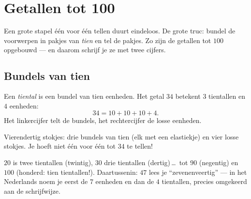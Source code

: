 \chapter{Getallen tot 100}\label{ch:g1:tens}

Een grote stapel één voor één tellen duurt eindeloos. De grote truc:
bundel de voorwerpen in pakjes van \emph{tien} en tel de pakjes. Zo
zijn de getallen tot $100$ opgebouwd --- en daarom schrijf je ze met
twee cijfers.

\section{Bundels van tien}

\begin{definition}\label{def:g1:tens:def}
Een \emph{tiental} is een bundel van tien eenheden. Het getal $34$
betekent $3$ tientallen en $4$ eenheden:
\[
34 = 10 + 10 + 10 + 4 .
\]
Het linkercijfer telt de bundels, het rechtercijfer de losse eenheden.
\end{definition}

\begin{omfigure}

{\small Vierendertig stokjes: drie bundels van tien (elk met een
elastiekje) en vier losse stokjes. Je hoeft niet één voor één tot $34$
te tellen!}
\end{omfigure}

\begin{example}\label{ex:g1:tens:reading}
$20$ is twee tientallen (twintig), $30$ drie tientallen
(dertig)\,\dots\ tot $90$ (negentig) en $100$ (honderd: tien
tientallen!). Daartussenin: $47$ lees je ``zevenenveertig'' --- in het
Nederlands noem je eerst de $7$ eenheden en dan de $4$ tientallen,
precies omgekeerd aan de schrijfwijze.
\end{example}


